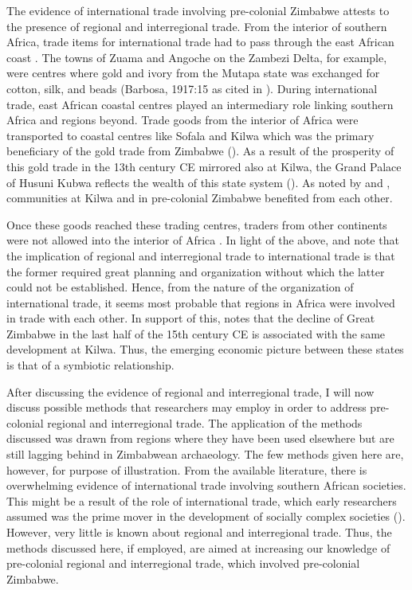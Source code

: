 The evidence of international trade involving pre-colonial Zimbabwe attests to the presence of regional and interregional trade. From the interior of southern Africa, trade items for international trade had to pass through the east African coast \parencite{pwiti2005}. The towns of Zuama and Angoche on the Zambezi Delta, for example, were centres where gold and ivory from the Mutapa state was exchanged for cotton, silk, and beads (Barbosa, 1917:15 as cited in \cite[][130]{kusimba1999}). During international trade, east African coastal centres played an intermediary role linking southern Africa and regions beyond. Trade goods from the interior of Africa were transported to coastal centres like Sofala and Kilwa which was the primary beneficiary of the gold trade from Zimbabwe (\cites{miller2000}{pwiti2005}{pikirayi2006}{huffman2009}).
As a result of the prosperity of this gold trade in the 13th century CE mirrored also at Kilwa, the Grand Palace of Husuni Kubwa reflects the wealth of this state system (\cites{pikirayi2006}{pikirayi2017}).
As noted by \textcite[][387]{pwiti2005} and \textcite{pikirayi2017},
communities at Kilwa and in pre-colonial Zimbabwe benefited from each other.

Once these goods reached these trading centres, traders from other continents were not allowed into the interior of Africa \parencite{alradi1990}. In light of the above, \textcite{kusimba1999} and \textcite{manyanga2006} note that the implication of regional and interregional trade to international trade is that the former required great planning and organization without which the latter could not be established. Hence, from the nature of the organization of international trade, it seems most probable that regions in Africa were involved in trade with each other. In support of this, \textcite{pwiti2005} notes that the decline of Great Zimbabwe in the last half of the 15th century CE is associated with the same development at Kilwa. Thus, the emerging economic picture between these states is that of a symbiotic relationship.

After discussing the evidence of regional and interregional trade, I will now discuss possible methods that researchers may employ in order to address pre-colonial regional and interregional trade. The application of the methods discussed was drawn from regions where they have been used elsewhere but are still lagging behind in Zimbabwean archaeology. The few methods given here are, however, for purpose of illustration. From the available literature, there is overwhelming evidence of international trade involving southern African societies.  This might be a result of the role of international trade, which early researchers assumed was the prime mover in the development of socially complex societies (\cites{huffman1972}{huffman1982}{huffman1986}{huffman2009}). %
However, very little is known about regional and interregional trade. Thus, the methods discussed here, if employed, are aimed at increasing our knowledge of pre-colonial regional and interregional trade, which involved pre-colonial Zimbabwe.

